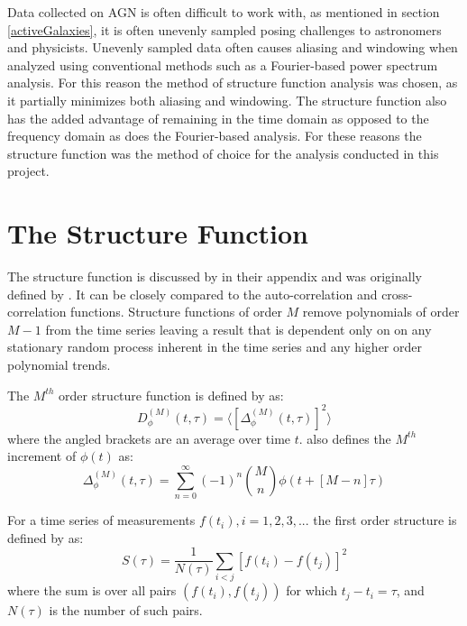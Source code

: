 \documentclass[12pt, oneside]{smuthesis}
\begin{document}
Data collected on AGN is often difficult to work with, as mentioned in section \ref{activeGalaxies}, it is often unevenly sampled posing challenges to astronomers and physicists. Unevenly sampled data often causes aliasing and windowing when analyzed using conventional methods such as a Fourier-based power spectrum analysis. For this reason the method of structure function analysis was chosen, as it partially minimizes both aliasing and windowing. The structure function also has the added advantage of remaining in the time domain as opposed to the frequency domain as does the Fourier-based analysis. For these reasons the structure function was the method of choice for the analysis conducted in this project.

\section{\sc The Structure Function} \label{structureFunction}

The structure function is discussed by \citep{cordes1985} in their appendix and was originally defined by \citep{rutman}. It can be closely compared to the auto-correlation and cross-correlation functions. Structure functions of order $M$ remove polynomials of order $M-1$ from the time series leaving a result that is dependent only on on any stationary random process inherent in the time series and any higher order polynomial trends.

The $M^{th}$ order structure function is defined by \cite{rutman} as:
\begin{equation} \label{eqn3.1}
D^{\left(M\right)}_{\phi}\left(t, \tau\right) = \langle\left[\Delta^{\left(M\right)}_{\phi}\left(t, \tau\right)\right]^{2}\rangle
\end{equation}
where the angled brackets are an average over time $t$. \cite{rutman} also defines the $M^{th}$ increment of $\phi\left(t\right)$ as:
\begin{equation} \label{eqn3.2}
\Delta^{\left(M\right)}_{\phi}\left(t, \tau\right) = \sum_{n=0}^{\infty}\left(-1\right)^{n}{M \choose n}\phi\left(t + \left[M - n\right]\tau\right)
\end{equation}

For a time series of measurements $f\left(t_{i}\right), i = 1,2,3,...$ the		 first order structure is defined by \citep{collier2001} as:
\begin{equation}
S\left(\tau\right) = \frac{1}{N\left(\tau\right)}\sum_{i<j}\left[f\left(t_{i}\right)-f\left(t_{j}\right)\right]^{2}
\end{equation}
where the sum is over all pairs $\left(f\left(t_{i}\right),f\left(t_{j}\right)\right)$ for which $t_{j}-t_{i}=\tau$, and $N\left(\tau\right)$ is the number of such pairs.
\end{document}
